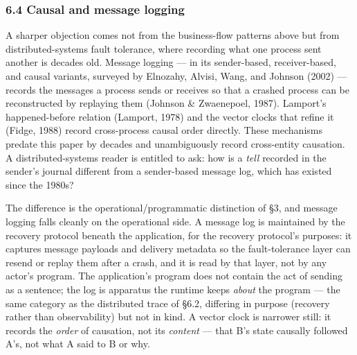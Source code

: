 \documentclass[
]{article}
\begin{document}
\subsubsection{6.4 Causal and message
logging}\label{causal-and-message-logging}

A sharper objection comes not from the business-flow patterns above but
from distributed-systems fault tolerance, where recording what one
process sent another is decades old. Message logging --- in its
sender-based, receiver-based, and causal variants, surveyed by Elnozahy,
Alvisi, Wang, and Johnson (2002) --- records the messages a process
sends or receives so that a crashed process can be reconstructed by
replaying them (Johnson \& Zwaenepoel, 1987). Lamport's happened-before
relation (Lamport, 1978) and the vector clocks that refine it (Fidge,
1988) record cross-process causal order directly. These mechanisms
predate this paper by decades and unambiguously record cross-entity
causation. A distributed-systems reader is entitled to ask: how is a
\emph{tell} recorded in the sender's journal different from a
sender-based message log, which has existed since the 1980s?

The difference is the operational/programmatic distinction of §3, and
message logging falls cleanly on the operational side. A message log is
maintained by the recovery protocol beneath the application, for the
recovery protocol's purposes: it captures message payloads and delivery
metadata so the fault-tolerance layer can resend or replay them after a
crash, and it is read by that layer, not by any actor's program. The
application's program does not contain the act of sending as a sentence;
the log is apparatus the runtime keeps \emph{about} the program --- the
same category as the distributed trace of §6.2, differing in purpose
(recovery rather than observability) but not in kind. A vector clock is
narrower still: it records the \emph{order} of causation, not its
\emph{content} --- that B's state causally followed A's, not what A said
to B or why.
\end{document}
